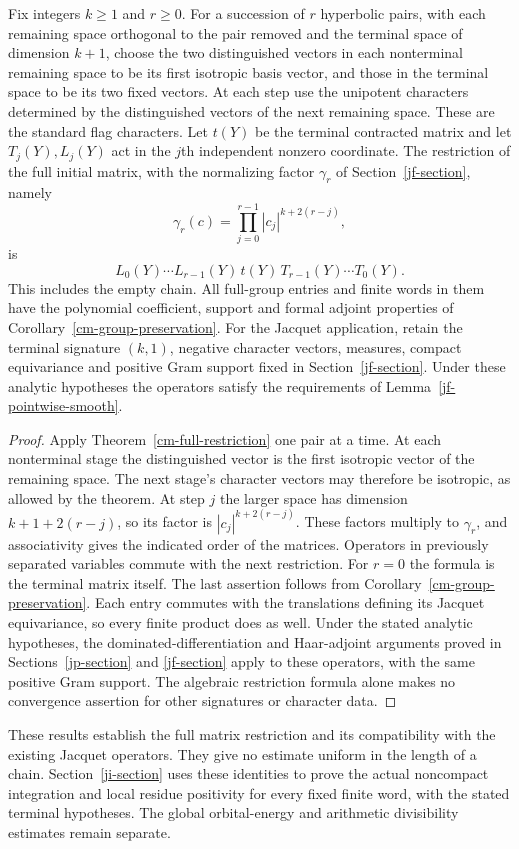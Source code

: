 \begin{corollary}\label{cm-chain-restriction}
Fix integers $k\geq1$ and $r\geq0$.  For a succession of $r$
hyperbolic pairs, with each remaining space orthogonal to the
pair removed and the terminal space of dimension $k+1$,
choose the two distinguished vectors in each nonterminal remaining
space to be its first isotropic basis vector, and those in the
terminal space to be its two fixed vectors.  At each step use the
unipotent characters determined by the distinguished vectors of the
next remaining space.  These are the standard flag characters.
Let $t(Y)$ be the
terminal contracted matrix and let $T_j(Y),L_j(Y)$ act in the
$j$th independent nonzero coordinate.  The restriction of the full
initial matrix, with the normalizing factor $\gamma_r$ of
Section~\ref{jf-section}, namely
\[
 \gamma_r(c)=\prod_{j=0}^{r-1}|c_j|^{k+2(r-j)},
\]
is
\begin{equation}\label{cm-full-chain}
 L_0(Y)\cdots L_{r-1}(Y)\,t(Y)\,
                       T_{r-1}(Y)\cdots T_0(Y).
\end{equation}
This includes the empty chain.  All full-group entries and finite
words in them have the polynomial coefficient, support and formal
adjoint properties of Corollary~\ref{cm-group-preservation}.
For the Jacquet application, retain the terminal signature $(k,1)$,
negative character vectors, measures, compact equivariance and
positive Gram support fixed in Section~\ref{jf-section}.
Under these analytic hypotheses the operators satisfy the
requirements of Lemma~\ref{jf-pointwise-smooth}.
\end{corollary}

\begin{proof}
Apply Theorem~\ref{cm-full-restriction} one pair at a time.
At each nonterminal stage the distinguished vector is the first
isotropic vector of the remaining space.  The next stage's character
vectors may therefore be isotropic, as allowed by the theorem.
At step $j$ the larger space has dimension $k+1+2(r-j)$,
so its factor is $|c_j|^{k+2(r-j)}$.
These factors multiply to $\gamma_r$, and associativity
gives the indicated order of the matrices.  Operators in previously
separated variables commute with the next restriction.  For $r=0$
the formula is the terminal matrix itself.
The last assertion follows from Corollary~\ref{cm-group-preservation}.
Each entry commutes with the translations defining its Jacquet
equivariance, so every finite product does as well.
Under the stated analytic hypotheses, the dominated-differentiation
and Haar-adjoint arguments proved in Sections~\ref{jp-section} and
\ref{jf-section} apply to these operators, with the same positive
Gram support.  The algebraic restriction formula alone makes no
convergence assertion for other signatures or character data.
\end{proof}

These results establish the full matrix restriction and its
compatibility with the existing Jacquet operators.  They give no
estimate uniform in the length of a chain.  Section~\ref{ji-section}
uses these identities to prove the actual noncompact integration
and local residue positivity for every fixed finite word, with the
stated terminal hypotheses.  The global orbital-energy and arithmetic
divisibility estimates remain separate.

